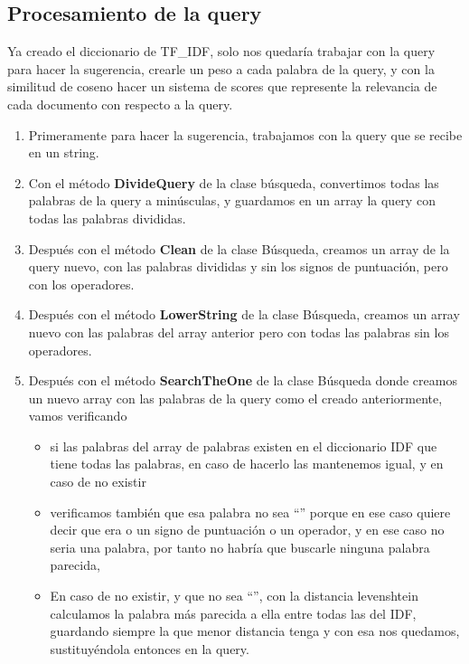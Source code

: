 \documentclass[12pt, a4paper]{article}
\begin{document}
\subsection{Procesamiento de la query}
            Ya creado el diccionario de TF\_IDF, solo nos quedaría trabajar con la query para hacer la
            sugerencia, crearle un peso a cada palabra de la query, y con la similitud de
            coseno hacer un sistema de scores que represente la relevancia de
            cada documento con respecto a la query.
            \begin{enumerate}
                  \item Primeramente para hacer la sugerencia, trabajamos con la query que
                        se recibe en un string.
                  \item Con el método \textbf{DivideQuery} de la clase búsqueda,
                        convertimos todas las palabras de la query a minúsculas, y guardamos en un array
                        la query con todas las palabras divididas.
                  \item Después con el método \textbf{Clean} de la clase Búsqueda,
                        creamos un array de la query nuevo, con las palabras divididas y
                        sin los signos de puntuación, pero con los operadores.
                  \item Después con el método \textbf{LowerString} de la clase Búsqueda,
                        creamos un array nuevo con las palabras del array anterior pero
                        con todas las palabras sin los operadores.
                  \item Después con el método \textbf{SearchTheOne} de la clase Búsqueda
                        donde creamos un nuevo array con las palabras de la query
                        como el creado anteriormente, vamos verificando

                        \begin{itemize}
                              \item si las palabras del array de palabras existen en el diccionario IDF
                                    que tiene todas las palabras, en caso de hacerlo las mantenemos igual,
                                    y en caso de no existir
                              \item verificamos también que esa palabra no sea “”
                                    porque en ese caso quiere decir que era o un signo de puntuación o un operador,
                                    y en ese caso no seria una palabra, por tanto no habría que buscarle
                                    ninguna palabra parecida,
                              \item En caso de no existir, y que no sea “”,
                                    con la distancia levenshtein calculamos la palabra más parecida a ella entre todas
                                    las del IDF, guardando siempre la que menor distancia tenga y con esa
                                    nos quedamos, sustituyéndola entonces en la query.



\end{itemize}
\end{enumerate}
\end{document}
